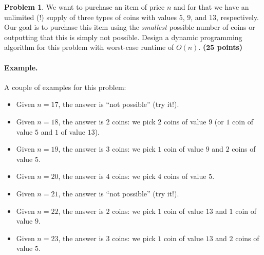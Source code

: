 \documentclass{article}
\theoremstyle{definition}
\newtheorem{problem}{Problem}
\newcommand{\grade}[1]{\hfill{\textbf{($\mathbf{#1}$ points)}}}
\begin{document}
\begin{problem}
	We want to purchase an item of price $n$ and for that we have an unlimited (!) supply of three types of coins with values $5$, $9$, and $13$, respectively. 
	Our goal is to purchase this item using the \emph{smallest} possible number of coins or outputting that this is simply not possible. 
	Design a dynamic programming algorithm for this problem with worst-case runtime of $O(n)$. \grade{25}
	
	\paragraph{Example.} A couple of examples for this problem: 
	\begin{itemize}
		\item Given $n=17$, the answer is ``not possible'' (try it!). 
		\item Given $n=18$, the answer is $2$ coins: we pick $2$ coins of value $9$ (or $1$ coin of value $5$ and $1$  of value $13$). 
		\item Given $n=19$, the answer is $3$ coins: we pick $1$ coin of value $9$ and $2$ coins of value $5$. 
		\item Given $n=20$, the answer is $4$ coins: we pick $4$ coins of value $5$.
		\item Given $n=21$, the answer is ``not possible'' (try it!). 
		\item Given $n=22$, the answer is $2$ coins: we pick $1$ coin of value $13$ and $1$ coin of value $9$. 
		\item Given $n=23$, the answer is $3$ coins: we pick $1$ coin of value $13$ and $2$ coins of value $5$. 
	\end{itemize}
\end{problem}
\end{document}
